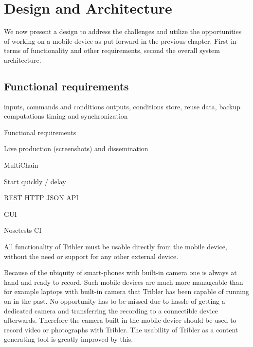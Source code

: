 \chapter{Design and Architecture}

We now present a design to address the challenges and utilize the opportunities of working on a mobile device as put forward in the previous chapter.
First in terms of functionality and other requirements, second the overall system architecture.


\section{Functional requirements} %

inputs, commands and conditions
outputs, conditions
store, reuse data, backup
computations
timing and synchronization


Functional requirements

Live production (screenshots) and dissemination

MultiChain

Start quickly / delay

REST HTTP JSON API

GUI

Nosetests CI


All functionality of Tribler must be usable directly from the mobile device, without the need or support for any other external device.

Because of the ubiquity of smart-phones with built-in camera one is always at hand and ready to record.
Such mobile devices are much more manageable than for example laptops with built-in camera that Tribler has been capable of running on in the past.
No opportunity has to be missed due to hassle of getting a dedicated camera and transferring the recording to a connectible device afterwards.
Therefore the camera built-in the mobile device should be used to record video or photographs with Tribler.
The usability of Tribler as a content generating tool is greatly improved by this. 

